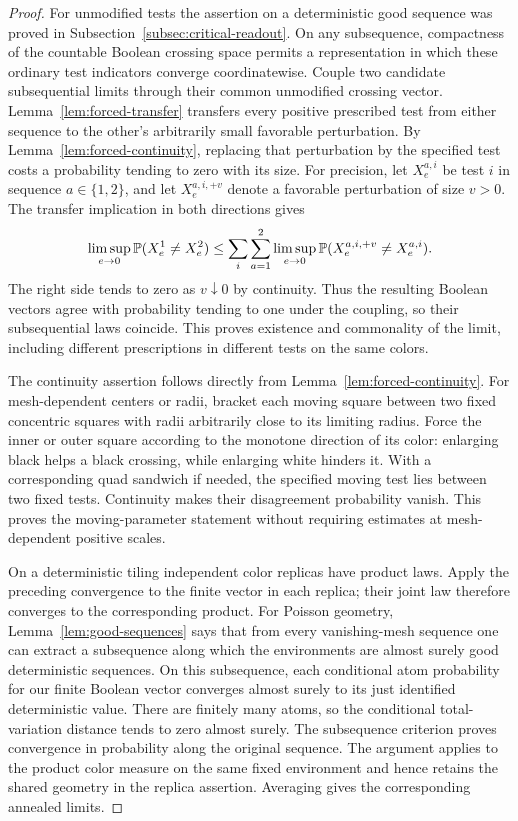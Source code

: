 \begin{proof}
For unmodified tests the assertion on a deterministic good sequence was
proved in Subsection~\ref{subsec:critical-readout}. On any subsequence,
compactness of the countable Boolean crossing space permits a representation
in which these ordinary test indicators converge coordinatewise. Couple two
candidate subsequential limits through their common unmodified crossing
vector. Lemma~\ref{lem:forced-transfer} transfers every positive prescribed
test from either sequence to the other's arbitrarily small favorable
perturbation. By Lemma~\ref{lem:forced-continuity}, replacing that perturbation
by the specified test costs a probability tending to zero with its size.
For precision, let $X_e^{a,i}$ be test $i$ in sequence $a\in\{1,2\}$,
and let $X_e^{a,i,+v}$ denote a favorable perturbation of size $v>0$.
The transfer implication in both directions gives
\[
 \limsup_{e\to0}\mathbb P(X_e^1\ne X_e^2)
 \le \sum_i\sum_{a=1}^2\limsup_{e\to0}
       \mathbb P(X_e^{a,i,+v}\ne X_e^{a,i}).
\]
The right side tends to zero as $v\downarrow0$ by continuity.
Thus the resulting Boolean vectors agree with probability tending to one
under the coupling, so their subsequential laws coincide. This proves existence
and commonality of the limit, including different prescriptions in different
tests on the same colors.

The continuity assertion follows directly from
Lemma~\ref{lem:forced-continuity}. For mesh-dependent centers or radii,
bracket each moving square between two fixed concentric squares with radii
arbitrarily close to its limiting radius. Force the inner or outer square
according to the monotone direction of its color: enlarging black helps a
black crossing, while enlarging white hinders it. With a corresponding quad
sandwich if needed, the specified moving test lies between two fixed tests.
Continuity makes their disagreement probability vanish. This proves the
moving-parameter statement without requiring estimates at mesh-dependent
positive scales.

On a deterministic tiling independent color replicas have product laws.
Apply the preceding convergence to the finite vector in each replica; their
joint law therefore converges to the corresponding product. For Poisson
geometry, Lemma~\ref{lem:good-sequences} says that from every vanishing-mesh
sequence one can extract a subsequence along which the environments are
almost surely good deterministic sequences. On this subsequence, each
conditional atom probability for our finite Boolean vector converges almost
surely to its just identified deterministic value. There are finitely many
atoms, so the conditional total-variation distance tends to zero almost
surely. The subsequence criterion proves convergence in probability along
the original sequence. The argument applies to the product color measure
on the same fixed environment and hence retains the shared geometry in the
replica assertion. Averaging gives the corresponding annealed limits.
\end{proof}
